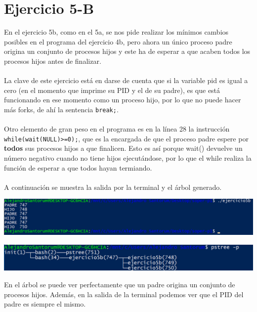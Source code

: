 \documentclass[12pt]{article}
\begin{document}
\section{Ejercicio 5-B}
En el ejercicio 5b, como en el 5a, se nos pide realizar los mínimos cambios posibles en el programa del ejercicio 4b, pero ahora un único proceso padre origina un conjunto de procesos hijos y este ha de esperar a que acaben todos los procesos hijos antes de finalizar.\\\\
La clave de este ejercicio está en darse de cuenta que si la variable pid es igual a cero (en el momento que imprime su PID y el de su padre), es que está funcionando en ese momento como un proceso hijo, por lo que no puede hacer más forks, de ahí la sentencia \texttt{break;}.\\\\
Otro elemento de gran peso en el programa es en la línea 28 la instrucción \texttt{while(wait(NULL)>=0);}, que es la encargada de que el proceso padre espere por \textbf{todos} sus procesos hijos a que finalicen. Esto es así porque wait() devuelve un número negativo cuando no tiene hijos ejecutándose, por lo que el while realiza la función de esperar a que todos hayan termiando.\\\\
A continuación se muestra la salida por la terminal y el árbol generado.
\begin{center}
	\includegraphics[scale=0.85]{ej5b.PNG}
\end{center}
\begin{center}
	\includegraphics[scale=1.03]{ej5b_pstree.PNG}
\end{center}
En el árbol se puede ver perfectamente que un padre origina un conjunto de procesos hijos. Además, en la salida de la terminal podemos ver que el PID del padre es siempre el mismo.\\
\end{document}
